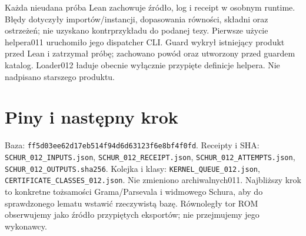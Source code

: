 \documentclass[11pt,a4paper]{article}
\newcommand{\code}[1]{\nolinkurl{#1}}
\begin{document}
Każda nieudana próba Lean zachowuje źródło, log i receipt w osobnym runtime.
Błędy dotyczyły importów/instancji, dopasowania równości, składni oraz
ostrzeżeń; nie uzyskano kontrprzykładu do podanej tezy.
Pierwsze użycie helpera011 uruchomiło jego dispatcher CLI. Guard wykrył
istniejący produkt przed Lean i zatrzymał próbę; zachowano powód oraz
utworzony przed guardem katalog. Loader012 ładuje obecnie wyłącznie
przypięte definicje helpera. Nie nadpisano starszego produktu.

\section{Piny i następny krok}
Baza: \code{ff5d03ee62d17eb514f94d6d63123f6e8bf4f0fd}.
Receipty i SHA: \code{SCHUR_012_INPUTS.json}, \code{SCHUR_012_RECEIPT.json},
\code{SCHUR_012_ATTEMPTS.json}, \code{SCHUR_012_OUTPUTS.sha256}.
Kolejka i klasy: \code{KERNEL_QUEUE_012.json},
\code{CERTIFICATE_CLASSES_012.json}. Nie zmieniono archiwalnych011.
Najbliższy krok to konkretne tożsamości Grama/Parsevala i widmowego Schura,
aby do sprawdzonego lematu wstawić rzeczywistą bazę. Równoległy tor ROM
obserwujemy jako źródło przypiętych eksportów; nie przejmujemy jego wykonawcy.
\end{document}
